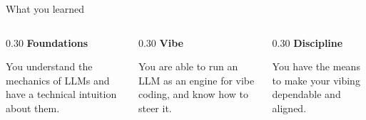 \documentclass[aspectratio=169]{beamer}
\begin{document}
\begin{frame}{What you learned}
  \begin{columns}[T,onlytextwidth]
    \begin{column}{0.30\textwidth}
      \textbf{Foundations}\par\smallskip
      {\color{tddim}You understand the mechanics of LLMs and have a technical intuition about them.}
    \end{column}
    \begin{column}{0.30\textwidth}
      \textbf{Vibe}\par\smallskip
      {\color{tddim}You are able to run an LLM as an engine for vibe coding, and know how to steer it.}
    \end{column}
    \begin{column}{0.30\textwidth}
      \textbf{Discipline} \par\smallskip
      {\color{tddim}You have the means to make your vibing dependable and aligned.}
    \end{column}
  \end{columns}
\end{frame}




%
\end{document}
